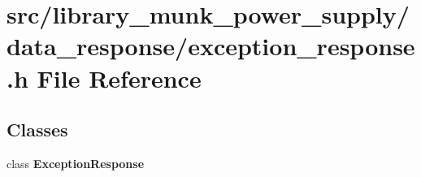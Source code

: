 \section{src/library\+\_\+munk\+\_\+power\+\_\+supply/data\+\_\+response/exception\+\_\+response.h File Reference}
\label{exception__response_8h}
\subsection*{Classes}
\begin{DoxyCompactItemize}
\item 
class \textbf{ Exception\+Response}
\end{DoxyCompactItemize}
